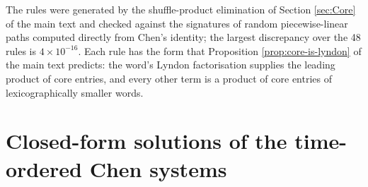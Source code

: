 \documentclass[11pt,english]{article}
\theoremstyle{definition}
\theoremstyle{remark}
\begin{document}
The rules were generated by the shuffle-product elimination of
Section \ref{sec:Core} of the main text and checked against the signatures of random
piecewise-linear paths computed directly from Chen's identity; the
largest discrepancy over the 48 rules is $4\times10^{-16}$. Each rule
has the form that Proposition \ref{prop:core-is-lyndon} of the main text predicts: the
word's Lyndon factorisation supplies the leading product of core
entries, and every other term is a product of core entries of
lexicographically smaller words.


\section{Closed-form solutions of the time-ordered Chen systems\label{app:ChenSolutions}}
\end{document}
